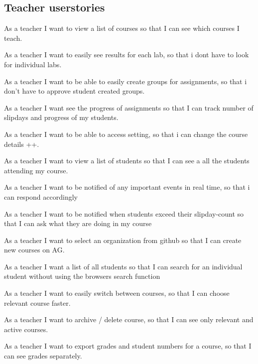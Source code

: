 \begin{appendices}
\begin{itemize*}
\subsection*{Teacher userstories}
\item As a teacher I want to view a list of courses so that I can see which courses I teach.
\item As a teacher I want to easily see results for each lab, so that i dont have to look for individual labs.
\item As a teacher I want to be able to easily create groups for assignments, so that i don't have to approve student created groups.
\item As a teacher I want see the progress of assignments so that I can track number of slipdays and progress of my students.
\item As a teacher I want to be able to access setting, so that i can change the course details ++.
\item As a teacher I want to view a list of students so that I can see a all the students attending my course.
\item As a teacher I want to be notified of any important events in real time, so that i can respond accordingly
\item As a teacher I want to be notified when students exceed their slipday-count so that I can ask what they are doing in my course
\item As a teacher I want to select an organization from github so that I can create new courses on AG.
\item As a teacher I want a list of all students so that I can search for an individual student without using the browsers search function
\item As a teacher I want to easily switch between courses, so that I can choose relevant course faster.
\item As a teacher I want to archive / delete course, so that I can see only relevant and active courses.
\item As a teacher I want to export grades and student numbers for a course, so that I can see grades separately.
\end{itemize*}
\end{appendices}

